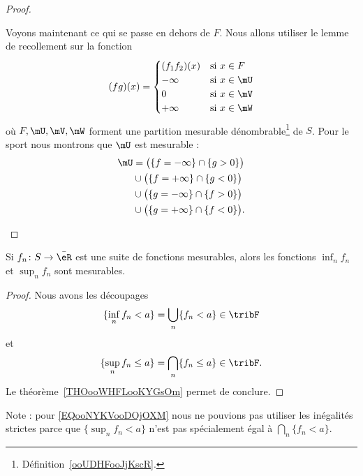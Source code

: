 \begin{proof}
\begin{subproof}
\begin{subproof}
			Voyons maintenant ce qui se passe en dehors de \( F\). Nous allons utiliser le lemme de recollement sur la fonction
			\begin{equation}
				(fg)(x)=\begin{cases}
					(f_1f_2)(x) & \text{si } x\in F   \\
					-\infty     & \text{si } x\in\mU  \\
					0           & \text{si } x\in \mV \\
					+\infty     & \text{si } x\in\mW
				\end{cases}
			\end{equation}
			où \( F,\mU,\mV,\mW\) forment une partition mesurable dénombrable\footnote{Définition~\ref{ooUDHFooJjKscR}.} de \( S\). Pour le sport nous montrons que \( \mU\) est mesurable :
			\begin{subequations}
				\begin{align}
					\mU & =\big( \{ f=-\infty \}\cap\{ g>0 \} \big)    \\
					    & \cup\big( \{ f=+\infty \}\cap\{ g<0 \} \big) \\
					    & \cup\big( \{ g=-\infty \}\cap\{ f>0 \} \big) \\
					    & \cup\big( \{ g=+\infty \}\cap\{ f<0 \}\big).
				\end{align}
			\end{subequations}
		\end{subproof}
	\end{subproof}
\end{proof}

\begin{proposition}     \label{ooABKWooPbfSOZ}
	Si \( f_n\colon S\to \bar \eR\) est une suite de fonctions mesurables, alors les fonctions \( \inf_n f_n\) et \( \sup_nf_n\) sont mesurables.
\end{proposition}

\begin{proof}
	Nous avons les découpages
	\begin{equation}
		\{ \inf_nf_n<a \}=\bigcup_n\{ f_n<a \}\in\tribF
	\end{equation}
	et
	\begin{equation}        \label{EQooNYKVooDOjOXM}
		\{ \sup_nf_n\leq a \}=\bigcap_n\{ f_n\leq a \}\in\tribF.
	\end{equation}
	Le théorème~\ref{THOooWHFLooKYGsOm} permet de conclure.
\end{proof}
Note : pour \eqref{EQooNYKVooDOjOXM} nous ne pouvions pas utiliser les inégalités strictes parce que \( \{ \sup_nf_n<a \}\) n'est pas spécialement égal à \( \bigcap_n\{ f_n<a \}\).

